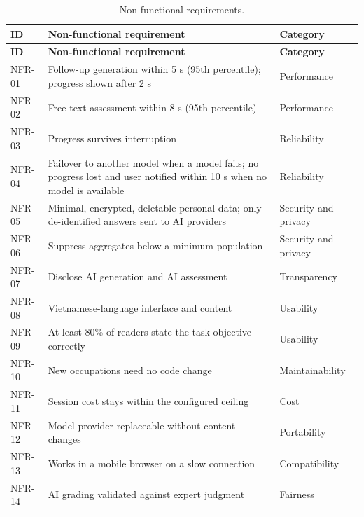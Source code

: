 {\small{}\renewcommand{\arraystretch}{1.1}
\begin{longtable}{|>{\raggedright\arraybackslash}p{}|>{\raggedright\arraybackslash}p{}|>{\raggedright\arraybackslash}p{}|}
\caption{Non-\allowbreak{}functional requirements.} \\
\hline
\textbf{ID} & \textbf{Non-\allowbreak{}functional requirement} & \textbf{Category} \\ \hline
\endfirsthead
\hline
\textbf{ID} & \textbf{Non-\allowbreak{}functional requirement} & \textbf{Category} \\ \hline
\endhead
NFR-01 & Follow-up generation within 5 s (95th percentile); progress shown after 2 s & Performance \\ \hline
NFR-02 & Free-text assessment within 8 s (95th percentile) & Performance \\ \hline
NFR-03 & Progress survives interruption & Reliability \\ \hline
NFR-04 & Failover to another model when a model fails; no progress lost and user notified within 10 s when no model is available & Reliability \\ \hline
NFR-05 & Minimal, encrypted, deletable personal data; only de-\allowbreak{}identified answers sent to AI providers & Security and privacy \\ \hline
NFR-06 & Suppress aggregates below a minimum population & Security and privacy \\ \hline
NFR-07 & Disclose AI generation and AI assessment & Transparency \\ \hline
NFR-08 & Vietnamese-\allowbreak{}language interface and content & Usability \\ \hline
NFR-09 & At least 80\% of readers state the task objective correctly & Usability \\ \hline
NFR-10 & New occupations need no code change & Maintainability \\ \hline
NFR-11 & Session cost stays within the configured ceiling & Cost \\ \hline
NFR-12 & Model provider replaceable without content changes & Portability \\ \hline
NFR-13 & Works in a mobile browser on a slow connection & Compatibility \\ \hline
NFR-14 & AI grading validated against expert judgment & Fairness \\ \hline

\end{longtable}}
